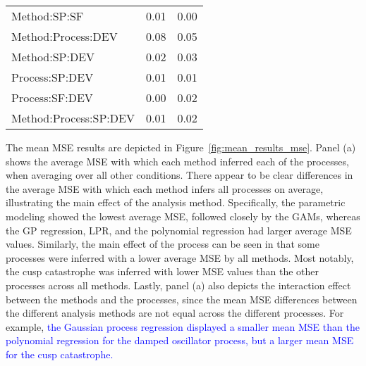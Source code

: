 \documentclass[man, floatsintext]{apa7}
\begin{document}
\begin{table}[tbp]
\begin{center}
\begin{threeparttable}
\begin{tabular}{lll}
        \\
        Method:SP:SF          & 0.01                                     & 0.00
        \\
        Method:Process:DEV    & 0.08                                     & 0.05
        \\
        Method:SP:DEV         & 0.02                                     & 0.03
        \\
        Process:SP:DEV        & 0.01                                     & 0.01
        \\
        Process:SF:DEV        & 0.00                                     & 0.02
        \\
        Method:Process:SP:DEV & 0.01                                     & 0.02
        \\
        \bottomrule
      \end{tabular}
    \end{threeparttable}
  \end{center}
\end{table}

The mean MSE results are depicted in Figure~\ref{fig:mean_results_mse}. Panel
(a) shows the average MSE with which each method inferred each of the
processes, when averaging over all other conditions. There appear to be clear
differences in the average MSE with which each method infers all processes on
average, illustrating the main effect of the analysis method. Specifically, the
parametric modeling showed the lowest average MSE, followed closely by the
GAMs, whereas the GP regression, LPR, and the polynomial regression had larger
average MSE values. Similarly, the main effect of the process can be seen in
that some processes were inferred with a lower average MSE by all methods. Most
notably, the cusp catastrophe was inferred with lower MSE values than the other
processes across all methods. Lastly, panel (a) also depicts the interaction
effect between the methods and the processes, since the mean MSE differences
between the different analysis methods are not equal across the different
processes. For example, \textcolor{blue}{the Gaussian process regression
  displayed a smaller mean MSE than the polynomial regression for the damped
  oscillator process, but a larger mean MSE for the cusp catastrophe.}
\end{document}
